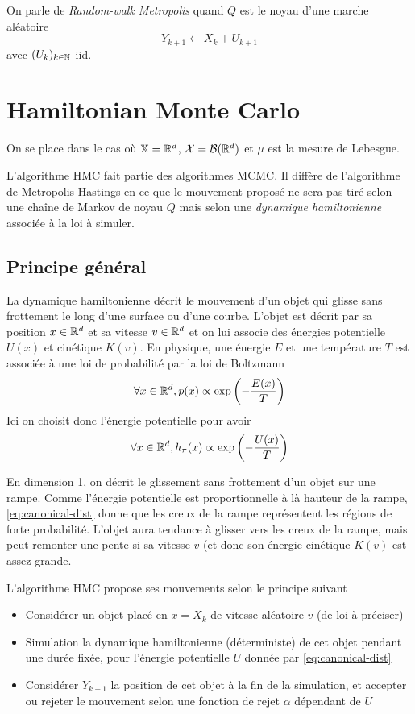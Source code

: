 \documentclass[10pt,a4paper]{article}
\begin{document}
\begin{Def}
  On parle de \emph{Random-walk Metropolis} quand $Q$ est le noyau d'une marche aléatoire
  $$Y_{k+1} \leftarrow X_k + U_{k+1}$$
  avec $(U_k)_{k \in \mathbb{N}}$ iid.
\end{Def}

\section{Hamiltonian Monte Carlo}

On se place dans le cas où $\mathbb{X} = \mathbb{R}^d$, $\mathcal{X} = \mathcal{B}(\mathbb{R}^d)$ et $\mu$ est la mesure de Lebesgue. 

L'algorithme HMC fait partie des algorithmes MCMC. Il diffère de l'algorithme de Metropolis-Hastings en ce que le mouvement proposé ne sera pas tiré selon une chaîne de Markov de noyau $Q$ mais selon une \emph{dynamique hamiltonienne} associée à la loi à simuler.

\subsection{Principe général}

La dynamique hamiltonienne décrit le mouvement d'un objet qui glisse sans frottement le long d'une surface ou d'une courbe. L'objet est décrit par sa position $x \in \mathbb{R}^d$ et sa vitesse $v \in \mathbb{R}^d$ et on lui associe des énergies potentielle $U(x)$ et cinétique $K(v)$. En physique, une énergie $E$ et une température $T$ est associée à une loi de probabilité par la loi de Boltzmann
$$\forall x \in \mathbb{R}^d,  p(x) \propto \exp \left( -\frac{E(x)}{T} \right)$$
Ici on choisit donc l'énergie potentielle pour avoir
\begin{equation}\label{eq:canonical-dist}
\forall x \in \mathbb{R}^d,  h_\pi(x) \propto \exp \left( -\frac{U(x)}{T} \right)
\end{equation}

En dimension 1, on décrit le glissement sans frottement d'un objet sur une rampe. Comme l'énergie potentielle est proportionnelle à là hauteur de la rampe, \eqref{eq:canonical-dist} donne que les creux de la rampe représentent les régions de forte probabilité. L'objet aura tendance à glisser vers les creux de la rampe, mais peut remonter une pente si sa vitesse $v$ (et donc son énergie cinétique $K(v)$ est assez grande.

L'algorithme HMC propose ses mouvements selon le principe suivant
\begin{itemize}
  \item Considérer un objet placé en $x = X_k$ de vitesse aléatoire $v$ (de loi à préciser)
  \item Simulation la dynamique hamiltonienne (déterministe) de cet objet pendant une durée fixée, pour l'énergie potentielle $U$ donnée par \ref{eq:canonical-dist}
  \item Considérer $Y_{k+1}$ la position de cet objet à la fin de la simulation, et accepter ou rejeter le mouvement selon une fonction de rejet $\alpha$ dépendant de $U$
\end{itemize}

\pagebreak


\end{document}

